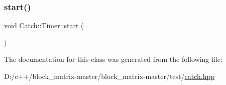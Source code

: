 \subsubsection{\texorpdfstring{start()}{start()}}
{\footnotesize\ttfamily void Catch\+::\+Timer\+::start (\begin{DoxyParamCaption}{ }\end{DoxyParamCaption})}



The documentation for this class was generated from the following file\+:\begin{DoxyCompactItemize}
\item 
D\+:/c++/block\+\_\+matrix-\/master/block\+\_\+matrix-\/master/test/\mbox{\hyperlink{catch_8hpp}{catch.\+hpp}}\end{DoxyCompactItemize}
